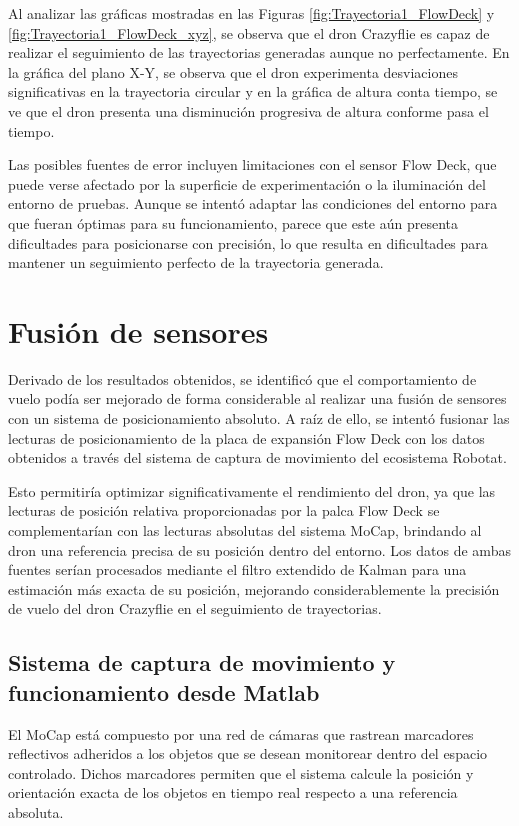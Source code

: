 Al analizar las gráficas mostradas en las Figuras \ref{fig:Trayectoria1_FlowDeck} y \ref{fig:Trayectoria1_FlowDeck_xyz}, se observa que el dron Crazyflie es capaz de realizar el seguimiento de las trayectorias generadas aunque no perfectamente. En la gráfica del plano X-Y, se observa que el dron experimenta desviaciones significativas en la trayectoria circular y en la gráfica de altura conta tiempo, se ve que el dron presenta una disminución progresiva de altura conforme pasa el tiempo. 

Las posibles fuentes de error incluyen limitaciones con el sensor Flow Deck, que puede verse afectado por la superficie de experimentación o la iluminación del entorno de pruebas. Aunque se intentó adaptar las condiciones del entorno para que fueran óptimas para su funcionamiento, parece que este aún presenta dificultades para posicionarse con precisión, lo que resulta en dificultades para mantener un seguimiento perfecto de la trayectoria generada. 

\newpage
\section{Fusión de sensores}
Derivado de los resultados obtenidos, se identificó que el comportamiento de vuelo podía ser mejorado de forma considerable al realizar una fusión de sensores con un sistema de posicionamiento absoluto. A raíz de ello, se intentó fusionar las lecturas de posicionamiento de la placa de expansión Flow Deck con los datos obtenidos a través del sistema de captura de movimiento del ecosistema Robotat.

Esto permitiría optimizar significativamente el rendimiento del dron, ya que las lecturas de posición relativa proporcionadas por la palca Flow Deck se complementarían con las lecturas absolutas del sistema MoCap, brindando al dron una referencia precisa de su posición dentro del entorno. Los datos de ambas fuentes serían procesados mediante el filtro extendido de Kalman para una estimación más exacta de su posición, mejorando considerablemente la precisión de vuelo del dron Crazyflie en el seguimiento de trayectorias.

\subsection{Sistema de captura de movimiento y funcionamiento desde Matlab}
El MoCap está compuesto por una red de cámaras que rastrean marcadores reflectivos adheridos a los objetos que se desean monitorear dentro del espacio controlado. Dichos marcadores permiten que el sistema calcule la posición y orientación exacta de los objetos en tiempo real respecto a una referencia absoluta. 

